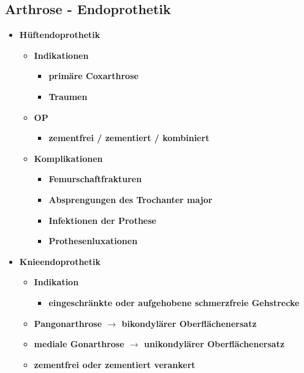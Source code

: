 \subsection{Arthrose - Endoprothetik}
	\begin{itemize}
		\item \textbf{Hüftendoprothetik}
			\begin{itemize}
				\item \textbf{Indikationen}
					\begin{itemize}
						\item \textbf{primäre Coxarthrose}
						\item \textbf{Traumen}
					\end{itemize}
				\item \textbf{OP}
					\begin{itemize}
						\item \textbf{zementfrei / zementiert / kombiniert}
					\end{itemize}
				\item \textbf{Komplikationen}
					\begin{itemize}
						\item \textbf{Femurschaftfrakturen}
						\item \textbf{Absprengungen des Trochanter major}
						\item \textbf{Infektionen der Prothese}
						\item \textbf{Prothesenluxationen}
					\end{itemize}
			\end{itemize}
		\item \textbf{Knieendoprothetik}
			\begin{itemize}
				\item \textbf{Indikation}
					\begin{itemize}
						\item \textbf{eingeschränkte oder aufgehobene schmerzfreie Gehstrecke}
					\end{itemize}
				\item \textbf{Pangonarthrose $\rightarrow$ bikondylärer Oberflächenersatz}
				\item \textbf{mediale Gonarthrose $\rightarrow$ unikondylärer Oberflächenersatz}
				\item \textbf{zementfrei oder zementiert verankert}
			\end{itemize}
 	\end{itemize}
	

